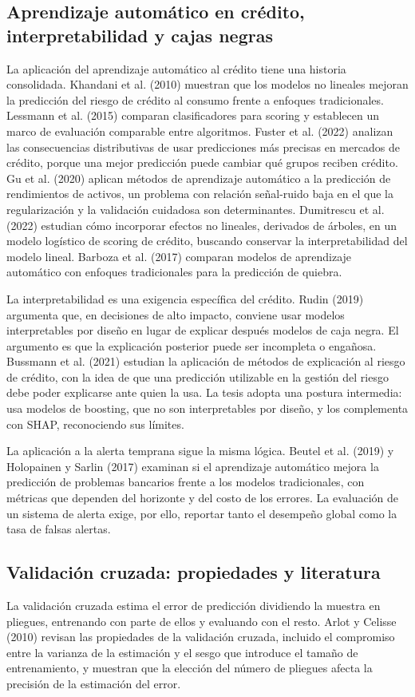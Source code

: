 \subsection{Aprendizaje automático en crédito, interpretabilidad y cajas negras}
La aplicación del aprendizaje automático al crédito tiene una historia consolidada. Khandani et al. (2010) muestran que los modelos no lineales mejoran la predicción del riesgo de crédito al consumo frente a enfoques tradicionales. Lessmann et al. (2015) comparan clasificadores para scoring y establecen un marco de evaluación comparable entre algoritmos. Fuster et al. (2022) analizan las consecuencias distributivas de usar predicciones más precisas en mercados de crédito, porque una mejor predicción puede cambiar qué grupos reciben crédito. Gu et al. (2020) aplican métodos de aprendizaje automático a la predicción de rendimientos de activos, un problema con relación señal-ruido baja en el que la regularización y la validación cuidadosa son determinantes. Dumitrescu et al. (2022) estudian cómo incorporar efectos no lineales, derivados de árboles, en un modelo logístico de scoring de crédito, buscando conservar la interpretabilidad del modelo lineal. Barboza et al. (2017) comparan modelos de aprendizaje automático con enfoques tradicionales para la predicción de quiebra.

La interpretabilidad es una exigencia específica del crédito. Rudin (2019) argumenta que, en decisiones de alto impacto, conviene usar modelos interpretables por diseño en lugar de explicar después modelos de caja negra. El argumento es que la explicación posterior puede ser incompleta o engañosa. Bussmann et al. (2021) estudian la aplicación de métodos de explicación al riesgo de crédito, con la idea de que una predicción utilizable en la gestión del riesgo debe poder explicarse ante quien la usa. La tesis adopta una postura intermedia: usa modelos de boosting, que no son interpretables por diseño, y los complementa con SHAP, reconociendo sus límites.

La aplicación a la alerta temprana sigue la misma lógica. Beutel et al. (2019) y Holopainen y Sarlin (2017) examinan si el aprendizaje automático mejora la predicción de problemas bancarios frente a los modelos tradicionales, con métricas que dependen del horizonte y del costo de los errores. La evaluación de un sistema de alerta exige, por ello, reportar tanto el desempeño global como la tasa de falsas alertas.

\subsection{Validación cruzada: propiedades y literatura}
La validación cruzada estima el error de predicción dividiendo la muestra en pliegues, entrenando con parte de ellos y evaluando con el resto. Arlot y Celisse (2010) revisan las propiedades de la validación cruzada, incluido el compromiso entre la varianza de la estimación y el sesgo que introduce el tamaño de entrenamiento, y muestran que la elección del número de pliegues afecta la precisión de la estimación del error.

